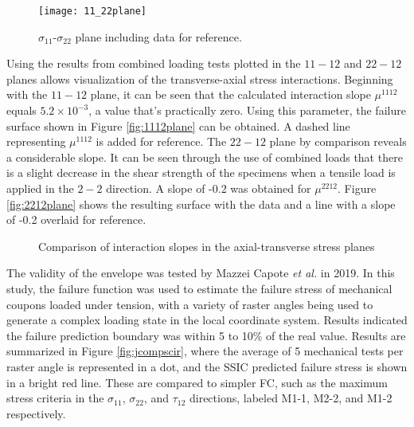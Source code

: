 \documentclass[main.tex]{subfiles}
\begin{document}
\begin{figure}[h]
	\center
	\texttt{[image: 11\_22plane]}
	\captionsetup{justification=centering} %
	\caption[failure envelope in the $\sigma_{11}$-$\sigma_{22}$ plane]{$\sigma_{11}$-$\sigma_{22}$ plane including data for reference.} \label{fig:1122plane}
\end{figure}

\pagebreak

Using the results from combined loading tests plotted in the $11-12$ and $22-12$ planes allows visualization of the transverse-axial stress interactions. Beginning with the $11-12$ plane, it can be seen that the calculated interaction slope $\mu^{1112}$ equals $5.2\times 10^{-3}$, a value that's practically zero. Using this parameter, the failure surface shown in Figure \ref{fig:1112plane} can be obtained. A dashed line representing $\mu^{1112}$ is added for reference. The $22-12$ plane by comparison reveals a considerable slope. It can be seen through the use of combined loads that there is a slight decrease in the shear strength of the specimens when a tensile load is applied in the $2-2$ direction. A slope of -0.2 was obtained for $\mu^{2212}$. Figure \ref{fig:2212plane} shows the resulting surface with the data and a line with a slope of -0.2 overlaid for reference.

\pagebreak

\begin{figure}[h]
	\center
	\linebreak
	\caption{Comparison of interaction slopes in the axial-transverse stress planes} \label{fig:SSIcomp}
\end{figure}

The validity of the envelope was tested by Mazzei Capote  \emph{et al.} \cite{MazzeiJCompSci} in 2019. In this study, the failure function was used to estimate the failure stress of mechanical coupons loaded under tension, with a variety of raster angles being used to generate a complex loading state in the local coordinate system. Results indicated the failure prediction boundary was within 5 to 10\% of the real value. Results are summarized in Figure \ref{fig:jcompscir}, where the average of 5 mechanical tests per raster angle is represented in a dot, and the SSIC predicted failure stress is shown in a bright red line. These are compared to simpler FC, such as the maximum stress criteria in the $\sigma_{11}$, $\sigma_{22}$, and $\tau_{12}$ directions, labeled M1-1, M2-2, and M1-2 respectively. 
\end{document}
